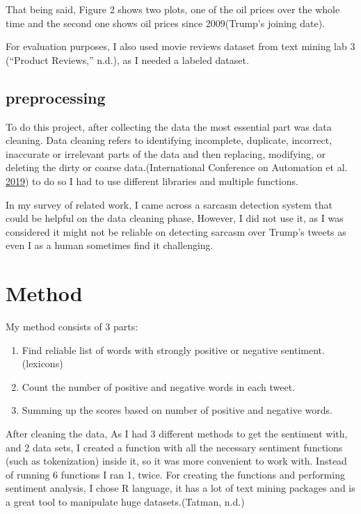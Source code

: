 \documentclass[]{article}
\providecommand{\tightlist}{%
  \setlength{\itemsep}{0pt}\setlength{\parskip}{0pt}}
\begin{document}
That being said, Figure 2 shows two plots, one of the oil prices over
the whole time and the second one shows oil prices since 2009(Trump's
joining date).

For evaluation purposes, I also used movie reviews dataset from text
mining lab 3 (``Product Reviews,'' n.d.), as I needed a labeled dataset.

\subsection{preprocessing}\label{preprocessing}

To do this project, after collecting the data the most essential part
was data cleaning. Data cleaning refers to identifying incomplete,
duplicate, incorrect, inaccurate or irrelevant parts of the data and
then replacing, modifying, or deleting the dirty or coarse
data.(International Conference on Automation et al.
\protect\hyperlink{ref-international_conference_on_automation_abstract_2019}{2019})
to do so I had to use different libraries and multiple functions.

In my survey of related work, I came across a sarcasm detection system
that could be helpful on the data cleaning phase, However, I did not use
it, as I was considered it might not be reliable on detecting sarcasm
over Trump's tweets as even I as a human sometimes find it challenging.

\section{Method}\label{method}

My method consists of 3 parts:

\begin{enumerate}
\def\labelenumi{\arabic{enumi}.}
\tightlist
\item
  Find reliable list of words with strongly positive or negative
  sentiment. (lexicons)
\item
  Count the number of positive and negative words in each tweet.\\
\item
  Summing up the scores based on number of positive and negative words.
\end{enumerate}

After cleaning the data, As I had 3 different methods to get the
sentiment with, and 2 data sets, I created a function with all the
necessary sentiment functions (such as tokenization) inside it, so it
was more convenient to work with. Instead of running 6 functions I ran
1, twice. For creating the functions and performing sentiment analysis,
I chose R language, it has a lot of text mining packages and is a great
tool to manipulate huge datasets.(Tatman, n.d.)
\end{document}
